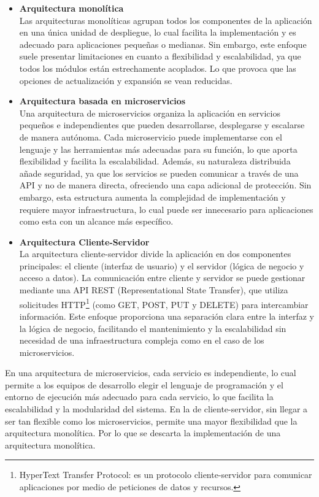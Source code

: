 \begin{itemize}
\item \textbf{Arquitectura monolítica}\\
Las arquitecturas monolíticas agrupan todos los componentes de la aplicación en una única unidad de despliegue, lo cual facilita la implementación y es adecuado para aplicaciones pequeñas o medianas. Sin embargo, este enfoque suele presentar limitaciones en cuanto a flexibilidad y escalabilidad, ya que todos los módulos están estrechamente acoplados. Lo que provoca que las opciones de actualización y expansión se vean reducidas.

\item \textbf{Arquitectura basada en microservicios}\\
Una arquitectura de microservicios organiza la aplicación en servicios pequeños e independientes que pueden desarrollarse, desplegarse y escalarse de manera autónoma. Cada microservicio puede implementarse con el lenguaje y las herramientas más adecuadas para su función, lo que aporta flexibilidad y facilita la escalabilidad. Además, su naturaleza distribuida añade seguridad, ya que los servicios se pueden comunicar a través de una API y no de manera directa, ofreciendo una capa adicional de protección. Sin embargo, esta estructura aumenta la complejidad de implementación y requiere mayor infraestructura, lo cual puede ser innecesario para aplicaciones como esta con un alcance más específico\cite{RedHat2023}\cite{lopez2017arquitectura}.

\item \textbf{Arquitectura Cliente-Servidor}\\
La arquitectura cliente-servidor divide la aplicación en dos componentes principales: el cliente (interfaz de usuario) y el servidor (lógica de negocio y acceso a datos). La comunicación entre cliente y servidor se puede gestionar mediante una API REST (Representational State Transfer), que utiliza solicitudes HTTP\footnote{HyperText Transfer Protocol: es un protocolo cliente-servidor para comunicar aplicaciones por medio de peticiones de datos y recursos.} (como GET, POST, PUT y DELETE) para intercambiar información. Este enfoque proporciona una separación clara entre la interfaz y la lógica de negocio, facilitando el mantenimiento y la escalabilidad sin necesidad de una infraestructura compleja como en el caso de los microservicios.

\end{itemize}

En una arquitectura de microservicios, cada servicio es independiente, lo cual permite a los equipos de desarrollo elegir el lenguaje de programación y el entorno de ejecución más adecuado para cada servicio, lo que facilita la escalabilidad y la modularidad del sistema. En la de cliente-servidor, sin llegar a ser tan flexible como los microservicios, permite una mayor flexibilidad que la arquitectura monolítica. Por lo que se descarta la implementación de una arquitectura monolítica.

